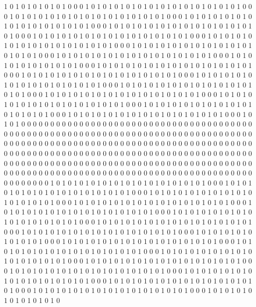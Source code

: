 1 0 1 0 1 0 1 0 1 0 1 0 0 0 1 0 1 0 1 0 1 0 1 0 1 0 1 0 1 0 1 0 1 0 1 0 1 0 1 0 1 0 0 0 1 0 1 0 1 0 1 0 1 0 1 0 1 0 1 0 1 0 1 0 1 0 1 0 1 0 1 0 0 0 1 0 1 0 1 0 1 0 1 0 1 0 1 0 1 0 1 0 1 0 1 0 1 0 1 0 1 0 0 0 1 0 1 0 1 0 1 0 1 0 1 0 1 0 1 0 1 0 1 0 1 0 1 0 1 0 1 0 0 0 1 0 1 0 1 0 1 0 1 0 1 0 1 0 1 0 1 0 1 0 1 0 1 0 1 0 1 0 0 0 1 0 1 0 1 0 1 0 1 0 1 0 1 0 1 0 1 0 1 0 1 0 1 0 1 0 1 0 0 0 1 0 1 0 1 0 1 0 1 0 1 0 1 0 1 0 1 0 1 0 1 0 1 0 1 0 1 0 0 0 1 0 1 0 1 0 1 0 1 0 1 0 1 0 1 0 1 0 1 0 1 0 1 0 1 0 1 0 0 0 1 0 1 0 1 0 
1 0 1 0 1 0 1 0 1 0 1 0 0 0 1 0 1 0 1 0 1 0 1 0 1 0 1 0 1 0 1 0 1 0 1 0 1 0 1 0 1 0 0 0 1 0 1 0 1 0 1 0 1 0 1 0 1 0 1 0 1 0 1 0 1 0 1 0 1 0 1 0 0 0 1 0 1 0 1 0 1 0 1 0 1 0 1 0 1 0 1 0 1 0 1 0 1 0 1 0 1 0 0 0 1 0 1 0 1 0 1 0 1 0 1 0 1 0 1 0 1 0 1 0 1 0 1 0 1 0 1 0 0 0 1 0 1 0 1 0 1 0 1 0 1 0 1 0 1 0 1 0 1 0 1 0 1 0 1 0 1 0 0 0 1 0 1 0 1 0 1 0 1 0 1 0 1 0 1 0 1 0 1 0 1 0 1 0 1 0 1 0 0 0 1 0 1 0 1 0 1 0 1 0 1 0 1 0 1 0 1 0 1 0 1 0 1 0 1 0 1 0 0 0 1 0 1 0 1 0 1 0 1 0 1 0 1 0 1 0 1 0 1 0 1 0 1 0 1 0 1 0 0 0 1 0 1 0 1 0 
0 0 0 0 0 0 0 0 0 0 0 0 0 0 0 0 0 0 0 0 0 0 0 0 0 0 0 0 0 0 0 0 0 0 0 0 0 0 0 0 0 0 0 0 0 0 0 0 0 0 0 0 0 0 0 0 0 0 0 0 0 0 0 0 0 0 0 0 0 0 0 0 0 0 0 0 0 0 0 0 0 0 0 0 0 0 0 0 0 0 0 0 0 0 0 0 0 0 0 0 0 0 0 0 0 0 0 0 0 0 0 0 0 0 0 0 0 0 0 0 0 0 0 0 0 0 0 0 0 0 0 0 0 0 0 0 0 0 0 0 0 0 0 0 0 0 0 0 0 0 0 0 0 0 0 0 0 0 0 0 0 0 0 0 0 0 0 0 0 0 0 0 0 0 0 0 0 0 0 0 0 0 0 0 0 0 0 0 0 0 0 0 0 0 0 0 0 0 0 0 0 0 0 0 0 0 0 0 0 0 0 0 0 0 0 0 0 0 0 0 0 0 0 0 0 0 0 0 0 0 0 0 0 0 0 0 0 0 0 0 0 0 0 0 0 0 0 0 0 0 0 0 0 0 0 0 0 0 0 0 
0 0 1 0 1 0 1 0 1 0 1 0 1 0 1 0 1 0 1 0 1 0 1 0 1 0 1 0 1 0 0 0 1 0 1 0 1 0 1 0 1 0 1 0 1 0 1 0 1 0 1 0 1 0 1 0 1 0 1 0 0 0 1 0 1 0 1 0 1 0 1 0 1 0 1 0 1 0 1 0 1 0 1 0 1 0 1 0 1 0 0 0 1 0 1 0 1 0 1 0 1 0 1 0 1 0 1 0 1 0 1 0 1 0 1 0 1 0 1 0 0 0 1 0 1 0 1 0 1 0 1 0 1 0 1 0 1 0 1 0 1 0 1 0 1 0 1 0 1 0 0 0 1 0 1 0 1 0 1 0 1 0 1 0 1 0 1 0 1 0 1 0 1 0 1 0 1 0 1 0 0 0 1 0 1 0 1 0 1 0 1 0 1 0 1 0 1 0 1 0 1 0 1 0 1 0 1 0 1 0 0 0 1 0 1 0 1 0 1 0 1 0 1 0 1 0 1 0 1 0 1 0 1 0 1 0 1 0 1 0 0 0 1 0 1 0 1 0 1 0 1 0 1 0 1 0 1 0 1 0 
0 0 1 0 1 0 1 0 1 0 1 0 1 0 1 0 1 0 1 0 1 0 1 0 1 0 1 0 1 0 0 0 1 0 1 0 1 0 1 0 1 0 1 0 1 0 1 0 1 0 1 0 1 0 1 0 1 0 1 0 0 0 1 0 1 0 1 0 1 0 1 0 1 0 1 0 1 0 1 0 1 0 1 0 1 0 1 0 1 0 0 0 1 0 1 0 1 0 1 0 1 0 1 0 1 0 1 0 1 0 1 0 1 0 1 0 1 0 1 0 0 0 1 0 1 0 1 0 1 0 1 0 1 0 1 0 1 0 1 0 1 0 1 0 1 0 1 0 1 0 0 0 1 0 1 0 1 0 1 0 1 0 1 0 1 0 1 0 1 0 1 0 1 0 1 0 1 0 1 0 0 0 1 0 1 0 1 0 1 0 1 0 1 0 1 0 1 0 1 0 1 0 1 0 1 0 1 0 1 0 0 0 1 0 1 0 1 0 1 0 1 0 1 0 1 0 1 0 1 0 1 0 1 0 1 0 1 0 1 0 0 0 1 0 1 0 1 0 1 0 1 0 1 0 1 0 1 0 1 0 
